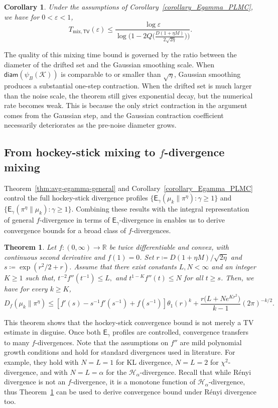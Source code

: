 \documentclass[10pt, journal]{IEEEtran}
\makeatletter
\def\eqref#1{equation~\ref{#1}}
\renewcommand{\eqref}[1]{\textup{\tagform@{\ref{#1}}}}
\newcommand{\sE}{\mathsf{E}}
\newtheorem{theorem}{Theorem}
\newtheorem{corollary}{Corollary}
\makeatother
\begin{document}
\begin{corollary}\label{corollary_TV_PLMC}
Under the assumptions of Corollary~\ref{corollary_Egamma_PLMC}, we have for $0<\varepsilon<1$,
$$T_{\mathrm{mix},\mathsf{TV}}(\varepsilon)\le \frac{\log\varepsilon}{\log\Big(1-2Q\Big(\frac{D(1+\eta M)}{2\sqrt{2\eta}}\Big)\Big)}.$$
\end{corollary}

The quality of this mixing time bound is governed by the ratio between the diameter of the drifted set and the Gaussian smoothing scale. When $\mathsf{diam}(\psi_B(\mathcal K))$ is comparable to or smaller than $\sqrt\eta$, Gaussian smoothing produces a substantial one-step contraction. When the drifted set is much larger than the noise scale, the theorem still gives exponential decay, but the numerical rate becomes weak. This is because the only strict contraction in the argument comes from the Gaussian step, and the Gaussian contraction coefficient necessarily deteriorates as the pre-noise diameter grows.

\subsection{From hockey-stick mixing to $f$-divergence mixing}
\label{subsec:plmc-fdiv}
Theorem~\ref{thm:avg-egamma-general} and Corollary~\ref{corollary_Egamma_PLMC} control the full hockey-stick divergence profiles $\{\mathsf E_\gamma(\mu_k\| \pi^\eta):\gamma\ge 1\}$ and $\{\mathsf E_\gamma(\pi^\eta\|\mu_k):\gamma\ge 1\}$. Combining these results with the integral representation of general $f$-divergence in terms of $\sE_\gamma$-divergence in \eqref{f_representation} enables us to derive convergence bounds for a broad class of $f$-divergences. 
\begin{theorem}\label{Theorem_fdivergence_PLMC}
Let $f:(0,\infty)\to\mathbb R$ be twice differentiable and convex, with continuous second derivative and $f(1)=0$. Set $r\coloneqq D(1+\eta M)/\sqrt{2\eta}$ and $s\coloneqq \exp(r^2/2+r)$. 
Assume that there exist constants $L,N<\infty$ and an integer $K\ge 1$ such that, $t^{-2}f''(t^{-1})\le L,$ and $t^{1-K}f''(t)\le N$ for all $t\ge s$. Then, we have for every $k\ge K$,
$$D_f(\mu_k\|\pi^\eta)\le \left[f'(s)-s^{-1}f'(s^{-1})+f(s^{-1})\right]\theta_1(r)^k+\frac{r\big(L+Ne^{Kr^2}\big)}{k-1}(2\pi)^{-k/2}.$$
\end{theorem}
This theorem shows that the hockey-stick convergence bound is not merely a TV estimate in disguise.
Once both $\mathsf E_\gamma$ profiles are controlled, convergence transfers to many $f$-divergences. Note that the assumptions on $f''$ are mild polynomial growth conditions and hold for standard divergences used in literature. For example, they hold with $N = L = 1$ for KL divergence, $N = L = 2$ for $\chi^2$-divergence, and with $N = L = \alpha$ for the $\mathcal{H}_\alpha$-divergence.
Recall that while R\'enyi divergence is not an $f$-divergence, it is a monotone function of $\mathcal{H}_\alpha$-divergence, thus Theorem~\ref{Theorem_fdivergence_PLMC} can be used to derive convergence bound under R\'enyi divergence too. 
\end{document}
